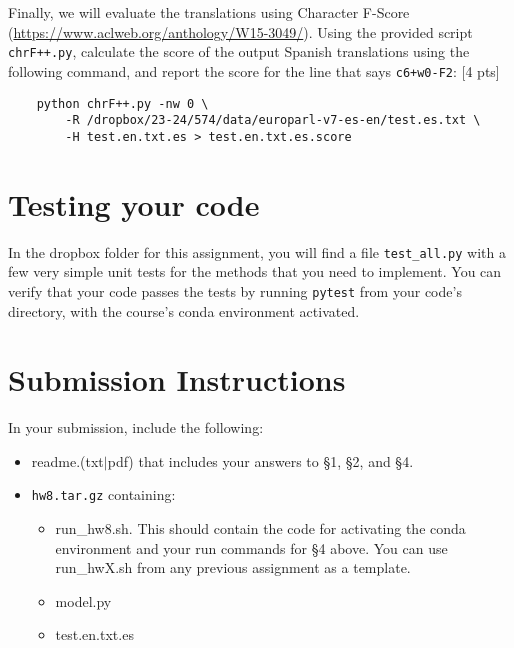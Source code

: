 \documentclass[11pt]{article}
\begin{document}
\vspace{2em}
 Finally, we will evaluate the translations using Character F-Score (\url{https://www.aclweb.org/anthology/W15-3049/}). Using the provided script \texttt{chrF++.py}, calculate the score of the output Spanish translations using the following command, and report the score for the line that says \texttt{c6+w0-F2}: \hfill [4 pts]
\begin{lstlisting}
    python chrF++.py -nw 0 \ 
        -R /dropbox/23-24/574/data/europarl-v7-es-en/test.es.txt \
        -H test.en.txt.es > test.en.txt.es.score
\end{lstlisting}

\section{Testing your code}

In the dropbox folder for this assignment, you will find a file \texttt{test\_all.py} with a few very simple unit tests for the methods that you need to implement.  You can verify that your code passes the tests by running \texttt{pytest} from your code's directory, with the course's conda environment activated.


\section*{Submission Instructions}

In your submission, include the following:
\begin{itemize}
  \item readme.(txt$\mid$pdf) that includes your answers to \S1, \S2, and \S4. 
  \item \texttt{hw8.tar.gz} containing:
  \begin{itemize}
    \item run\_hw8.sh.  This should contain the code for activating the conda environment and your run commands for \S4 above.  You can use run\_hwX.sh from any previous assignment as a template.
    \item model.py
    \item test.en.txt.es
    \end{itemize}
\end{itemize}
\end{document}
